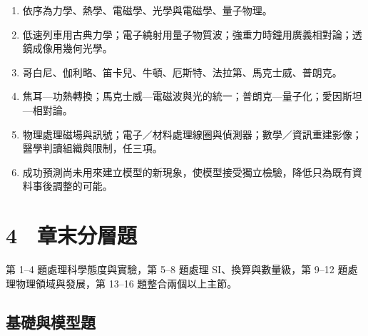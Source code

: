 \documentclass[11pt,a4paper]{article}
\providecommand{\tightlist}{%
  \setlength{\itemsep}{0pt}\setlength{\parskip}{0pt}}
\begin{document}
\begin{enumerate}
\def\labelenumi{\arabic{enumi}.}
\tightlist
\item
  依序為力學、熱學、電磁學、光學與電磁學、量子物理。
\item
  低速列車用古典力學；電子繞射用量子物質波；強重力時鐘用廣義相對論；透鏡成像用幾何光學。
\item
  哥白尼、伽利略、笛卡兒、牛頓、厄斯特、法拉第、馬克士威、普朗克。
\item
  焦耳---功熱轉換；馬克士威---電磁波與光的統一；普朗克---量子化；愛因斯坦---相對論。
\item
  物理處理磁場與訊號；電子／材料處理線圈與偵測器；數學／資訊重建影像；醫學判讀組織與限制，任三項。
\item
  成功預測尚未用來建立模型的新現象，使模型接受獨立檢驗，降低只為既有資料事後調整的可能。
\end{enumerate}

\section{4　章末分層題}\label{ux7ae0ux672bux5206ux5c64ux984c}

第 1--4 題處理科學態度與實驗，第 5--8 題處理 SI、換算與數量級，第 9--12 題處理物理領域與發展，第 13--16 題整合兩個以上主節。

\subsection{基礎與模型題}\label{ux57faux790eux8207ux6a21ux578bux984c}
\end{document}
